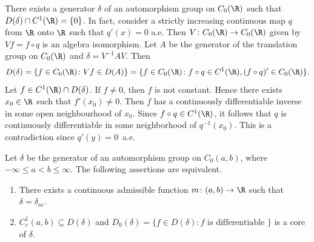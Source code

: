 \begin{example}\label{ex:b2-3.22}
%
There exists a generator $\delta$ of an automorphism group on $C_{0}(\R)$ such that $D(\delta) \cap C^{1}(\R) = \{0\}$.
In fact, consider a strictly increasing continuous map $q$ from $\R$ onto $\R$ such that
$q'(x) = 0$ a.e.
Then $V \colon C_{0}(\R) \to C_{0}(\R)$ given by $Vf = f \circ q$ is an algebra isomorphism.
Let $A$ be the generator of the translation group on $C_{0}(\R)$ and $\delta = V^{-1}AV$.
Then 
\[
D(\delta) = \{ f \in C_{0}(\R) \colon Vf \in D(A)\} = \{f \in C_{0}(\R) \colon f \circ q \in C^{1}(\R), (f \circ q)' \in C_{0}(\R) \}.
\]
Let $f \in C^{1}(\R) \cap D(\delta)$.
If\/ $f \neq 0$, then $f$ is not constant.
Hence there exists $x_{0} \in \R$ such that $f'(x_{0}) \neq 0$.
Then $f$ has a continuously differentiable inverse in some open neighbourhood of\/ $x_{0}$.
Since $f \circ q \in C^{1}(\R)$, it follows that $q$ is continuously differentiable in some neighborhood of\/ $q^{-1}(x_{0})$.
This is a contradiction since $q'(y) = 0$~a.e.
\end{example}
\begin{theorem}\label{thm:b2-3.23}
%
Let $\delta$ be the generator of an automorphism group on $C_{0}(a,b)$, where $-\infty \leq a < b \leq \infty$.
The following assertions are equivalent.
\begin{enumerate}[\upshape (a)]
\item \label{thm:b2-3.23-1} 
There exists a continuous admissible function $m \colon (a,b) \to \R$ such that $\delta = \delta_{m}$.
\item \label{thm:b2-3.23-2}
$C_{c}^{1}(a,b) \subseteq D(\delta)$ and $D_{0}(\delta) = \{ f \in D(\delta) \colon f \text{ is differentiable } \}$ is a core of\/ $\delta$.
\end{enumerate}
\end{theorem}
